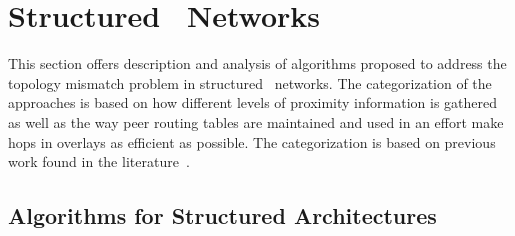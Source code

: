 \section{Structured \p\ Networks}
\label{section:structured}

This section offers description and analysis of algorithms proposed
to address the topology mismatch problem in structured \p\ networks. 
The categorization of the approaches is based on how different
levels of proximity information is gathered as well as  
the way peer routing tables are maintained and used in an effort make hops in
overlays as efficient as possible. 
The categorization is based on previous work found in the
literature~\cite{CDHR2002,CDCR2002,RSS2002}.


\subsection{Algorithms for Structured Architectures}



